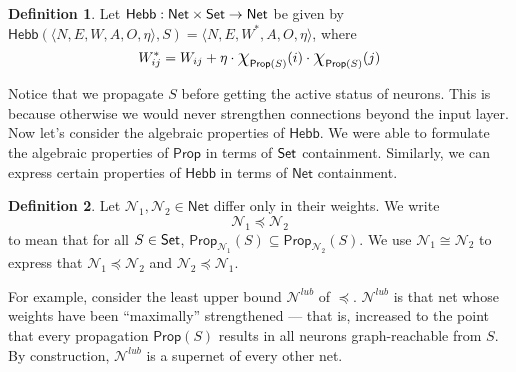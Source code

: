 \documentclass[letterpaper]{article}
\theoremstyle{definition}
\newtheorem{definition}{Definition}
\newcommand{\Set}{\mbox{\sf Set}}
\newcommand*{\bigchi}{\mbox{\Large$\chi$}}%
\newcommand{\Prop}{\textsf{Prop}}
\newcommand{\Inc}{\textsf{Hebb}}
\newcommand{\AllNets}{\mathsf{Net}}
\newcommand{\Net}{\mathcal{N}}
\begin{document}
\begin{definition}
\label{def:inc}
Let ${\Inc : \AllNets \times \Set \to \AllNets}$ be given by $\Inc(\langle N, E, W, A, O, \eta \rangle, S) = \langle N, E, W^\ast, A, O, \eta \rangle$, where
\[
    W_{ij}^\ast = W_{ij} + \eta \cdot \bigchi_{\Prop(S)}(i) \cdot  \bigchi_{\Prop(S)}(j)
\]
\end{definition}
Notice that we propagate $S$ before getting the active status of neurons. This is because otherwise we would never strengthen connections beyond the input layer. Now let's consider the algebraic properties of $\Inc$. We were able to formulate the algebraic properties of $\Prop$ in terms of $\Set$ containment. Similarly, we can express certain properties of $\Inc$ in terms of $\AllNets$ containment.

\begin{definition}
Let $\Net_1, \Net_2 \in \AllNets$ differ only in their weights.  We write
\[
    \Net_1 \preceq \Net_2
\]
to mean that for all $S \in \Set$, $\Prop_{\Net_1}(S) \subseteq \Prop_{\Net_2}(S)$.  We use $\Net_1 \cong \Net_2$ to express that $\Net_1 \preceq \Net_2$ and $\Net_2 \preceq \Net_1$.
\end{definition}

For example, consider the least upper bound $\mathcal{N}^{lub}$ of $\preceq$.  $\mathcal{N}^{lub}$ is that net whose weights have been ``maximally'' strengthened --- that is, increased to the point that every propagation $\Prop(S)$ results in all neurons graph-reachable from $S$.  By construction, $\mathcal{N}^{lub}$ is a supernet of every other net.
\end{document}
